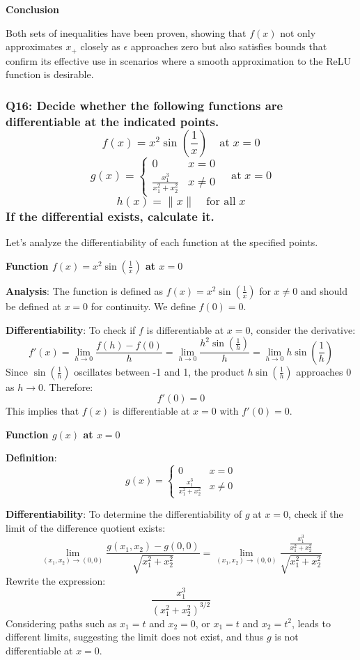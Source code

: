 \documentclass[8pt]{article}
\begin{document}
\textbf{Conclusion}

Both sets of inequalities have been proven, showing that \( f(x) \) not only approximates \( x_+ \) closely as \(\epsilon\) approaches zero but also satisfies bounds that confirm its effective use in scenarios where a smooth approximation to the ReLU function is desirable.

\subsubsection*{Q16: Decide whether the following functions are differentiable at the indicated points.
\[
f(x) = x^2 \sin\left(\frac{1}{x}\right) \quad \text{at} \; x = 0
\]
\[
g(x) = 
\begin{cases} 
0 & x = 0 \\ 
\frac{x_1^3}{x_1^2 + x_2^2} & x \neq 0 
\end{cases} 
\quad \text{at} \; x = 0
\]
\[
h(x) = \| x \| \quad \text{for all} \; x
\]
If the differential exists, calculate it.}

Let's analyze the differentiability of each function at the specified points.

\textbf{Function \( f(x) = x^2 \sin\left(\frac{1}{x}\right) \) at \( x = 0 \)}

\textbf{Analysis}:
The function is defined as \( f(x) = x^2 \sin\left(\frac{1}{x}\right) \) for \( x \neq 0 \) and should be defined at \( x = 0 \) for continuity. We define \( f(0) = 0 \).

\textbf{Differentiability}:
To check if \( f \) is differentiable at \( x = 0 \), consider the derivative:
\[ f'(x) = \lim_{h \to 0} \frac{f(h) - f(0)}{h} = \lim_{h \to 0} \frac{h^2 \sin\left(\frac{1}{h}\right)}{h} = \lim_{h \to 0} h \sin\left(\frac{1}{h}\right) \]
Since \( \sin\left(\frac{1}{h}\right) \) oscillates between -1 and 1, the product \( h \sin\left(\frac{1}{h}\right) \) approaches 0 as \( h \to 0 \). Therefore:
\[ f'(0) = 0 \]
This implies that \( f(x) \) is differentiable at \( x = 0 \) with \( f'(0) = 0 \).

\textbf{Function \( g(x) \) at \( x = 0 \)}

\textbf{Definition}:
\[ g(x) = \begin{cases} 
0 & x = 0 \\ 
\frac{x_1^3}{x_1^2 + x_2^2} & x \neq 0 
\end{cases} \]

\textbf{Differentiability}:
To determine the differentiability of \( g \) at \( x = 0 \), check if the limit of the difference quotient exists:
\[ \lim_{(x_1, x_2) \to (0,0)} \frac{g(x_1, x_2) - g(0,0)}{\sqrt{x_1^2 + x_2^2}} = \lim_{(x_1, x_2) \to (0,0)} \frac{\frac{x_1^3}{x_1^2 + x_2^2}}{\sqrt{x_1^2 + x_2^2}} \]
Rewrite the expression:
\[ \frac{x_1^3}{(x_1^2 + x_2^2)^{3/2}} \]
Considering paths such as \( x_1 = t \) and \( x_2 = 0 \), or \( x_1 = t \) and \( x_2 = t^2 \), leads to different limits, suggesting the limit does not exist, and thus \( g \) is not differentiable at \( x = 0 \).
\end{document}
